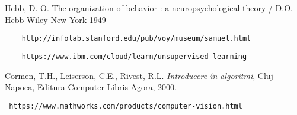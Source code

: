 


\begin{thebibliography}{99}

 Hebb, D. O.  The organization of behavior : a neuropsychological theory / D.O. Hebb  Wiley New York  1949

 \begin{verbatim}
	http://infolab.stanford.edu/pub/voy/museum/samuel.html
\end{verbatim}

 \begin{verbatim}
	https://www.ibm.com/cloud/learn/unsupervised-learning
\end{verbatim}





 Cormen,  T.H.,  Leiserson,  C.E.,  Rivest,  R.L. \textit{Introducere \^ in algoritmi}, Cluj-Napoca, Editura Computer Libris Agora, 2000.

 \begin{verbatim} https://www.mathworks.com/products/computer-vision.html
\end{verbatim}


\end{thebibliography}

